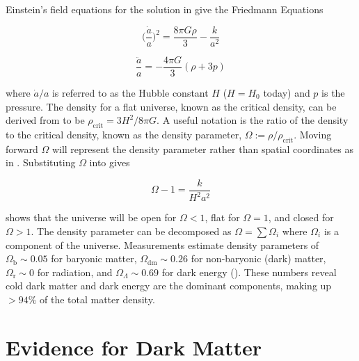 Einstein's field equations for the solution in  give the Friedmann Equations

\begin{equation}
\bigg(\frac{\dot{a}}{a}\bigg)^{2} = \frac{8\pi G \rho}{3} - \frac{k}{a^{2}}
\label{eq:friedman1}
\end{equation}

\begin{equation}
\frac{\ddot{a}}{a} = -\frac{4\pi G}{3}(\rho + 3p)
\label{eq:friedman2}
\end{equation}

\noindent where $\dot{a}/a$ is referred to as the Hubble
constant $H$ ($H = H_{0}$ today) and $p$ is the pressure.  The density for a flat universe, known as the critical density, can be derived
from  to be $\rho_{\mathrm{crit}} = 3H^2 / 8\pi G$.  A useful
notation is the ratio of the density to the critical density, known as the density parameter,
$\Omega := \rho/\rho_{\mathrm{crit}}$.  Moving forward $\Omega$ will represent the density
parameter rather than spatial coordinates as in .  Substituting
$\Omega$ into  gives

\vspace{-5pt}

\begin{equation}
\Omega - 1 = \frac{k}{H^{2}{a^{2}}}
\label{eq:dark_matter_lambda_cdm_dens_par}
\end{equation}

 shows that the universe will be open for $\Omega < 1$, flat for $\Omega = 1$, and
closed for $\Omega > 1$.  The density parameter can be decomposed as $\Omega = \sum \Omega_{i}$ where $\Omega_{i}$ is a component of the
universe.  Measurements estimate density parameters of $\Omega_{\mathrm{b}} \sim 0.05$ for baryonic matter,
$\Omega_{\mathrm{dm}} \sim 0.26$ for non-baryonic (dark)
matter, $\Omega_{\mathrm{r}} \sim 0$
for radiation, and $\Omega_{\Lambda} \sim 0.69$ for dark energy ().  These numbers reveal cold dark matter and dark
energy are the dominant components, making up $> 94\%$ of the total matter density.



\section[Evidence for Dark Matter][Evidence for Dark Matter]{Evidence for Dark Matter}
\label{sec:dark_matter_evidence}
